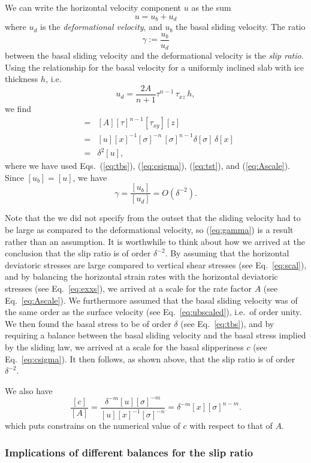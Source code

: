 \documentclass[10pt,a4paper]{book}
\newcommand{\de}{\delta}
\begin{document}
We can write the horizontal velocity component $u$ as the sum
\[
u=u_b+u_d
\]
where $u_d$ is the {\em deformational velocity}, and $u_b$ the basal sliding velocity. The ratio
\[
\gamma:= \frac{u_b}{u_d}
\]
between the basal sliding velocity and the deformational velocity is
the {\em slip ratio}. Using the relationship for the basal velocity for a uniformly inclined slab with ice thickness $h$, i.e.\
\[
u_d=\frac{2 A}{n+1} \tau^{n-1} \, \tau_{xz} \,h ,
\]
we find
\begin{eqnarray}
[u_d]&=&[A] [\tau]^{n-1} [\tau_{xy}] [z]\\
     &=&[u] [x]^{-1} [\sigma]^{-n} \,  [\sigma]^{n-1} \de [\sigma]  \, \de [x] \label{eq:udscale} \\
     &=& \de^2 [u] ,
\end{eqnarray}
where we have used Eqs.~(\ref{eq:tbs}), (\ref{eq:csigma}), (\ref{eq:tst}), and (\ref{eq:Ascale}).
Since $[u_b]=[u]$, we have
\begin{equation}
\gamma=\frac{[u_b]}{[u_d]}= O(\de^{-2}) .
\label{eq:gamma}
\end{equation}


Note that the we did not specify from the outset that the sliding velocity had to be large as
compared to the deformational velocity, so (\ref{eq:gamma}) is a result rather than an assumption. It
is worthwhile to think about how we arrived at the conclusion that the slip ratio is of order
$\de^{-2}$. By assuming that the horizontal deviatoric stresses are large compared to vertical shear
stresses (see Eq.~\ref{eq:scal}), and by balancing the horizontal strain rates with the horizontal
deviatoric stresses (see Eq.~\ref{eq:exxs}), we arrived at a scale for the rate factor $A$ (see
Eq.~\ref{eq:Ascale}). We furthermore assumed that the basal sliding velocity was of the same order
as the surface velocity (see Eq.~\ref{eq:ubscaled}), i.e.\ of order unity. We then found the basal
stress to be of order $\de$ (see Eq.~\ref{eq:tbs}), and by requiring a balance between the basal
sliding velocity and the basal stress implied by the sliding law, we arrived at a scale for the
basal slipperiness $c$ (see Eq.~\ref{eq:csigma}). It then follows, as shown above, that the slip
ratio is of order $\de^{-2}$.


We also have
\[
\frac{[c]}{[A]}= \frac{\de^{-m} [u] [\sigma]^{-m}}{[u] [x]^{-1} [\sigma]^{-n}}
= \de^{-m} [x] [\sigma]^{n-m} .
\]
which puts constrains on the numerical value of $c$ with respect to that of $A$.

\subsubsection{Implications of different balances for the slip ratio}
\end{document}
